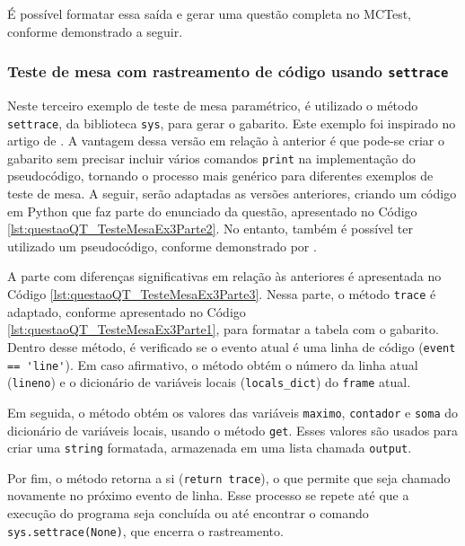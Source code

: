 É possível formatar essa saída e gerar uma questão completa no MCTest, conforme demonstrado a seguir.

\subsubsection{Teste de mesa com rastreamento de código usando \texttt{settrace}}

Neste terceiro exemplo de teste de mesa paramétrico, é utilizado o método \verb|settrace|, da biblioteca \verb|sys|, para gerar o gabarito. Este exemplo foi inspirado no artigo de . A vantagem dessa versão em relação à anterior é que pode-se criar o gabarito sem precisar incluir vários comandos \verb|print| na implementação do pseudocódigo, tornando o processo mais genérico para diferentes exemplos de teste de mesa. A seguir, serão adaptadas as versões anteriores, criando um código em Python que faz parte do enunciado da questão, apresentado no Código \ref{lst:questaoQT_TesteMesaEx3Parte2}. No entanto, também é possível ter utilizado um pseudocódigo, conforme demonstrado por .

A parte com diferenças significativas em relação às anteriores é apresentada no Código \ref{lst:questaoQT_TesteMesaEx3Parte3}. Nessa parte, o método \verb|trace| é adaptado, conforme apresentado no Código \ref{lst:questaoQT_TesteMesaEx3Parte1}, para formatar a tabela com o gabarito. Dentro desse método, é verificado se o evento atual é uma linha de código (\verb|event == 'line'|). Em caso afirmativo, o método obtém o número da linha atual (\verb|lineno|) e o dicionário de variáveis locais (\verb|locals_dict|) do \verb|frame| atual.

Em seguida, o método obtém os valores das variáveis \verb|maximo|, \verb|contador| e \verb|soma| do dicionário de variáveis locais, usando o método \verb|get|. Esses valores são usados para criar uma \verb|string| formatada, armazenada em uma lista chamada \verb|output|.

Por fim, o método retorna a si (\verb|return trace|), o que permite que seja chamado novamente no próximo evento de linha. Esse processo se repete até que a execução do programa seja concluída ou até encontrar o comando \verb|sys.settrace(None)|, que encerra o rastreamento.


